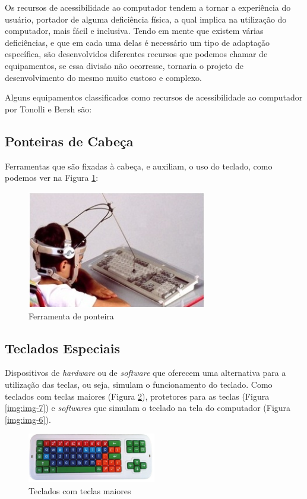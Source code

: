 \documentclass[
	12pt,			%
	openright,		%
	oneside,			%
	a4paper,			%
	chapter=TITLE,		%
	english,			%
	brazil,			%
	]{abntex2}
\begin{document}
Os recursos de acessibilidade ao computador tendem a tornar a experiência do usuário, portador de alguma deficiência física, a qual implica na utilização do computador, mais fácil e inclusiva. Tendo em mente que existem várias deficiências, e que em cada uma delas é necessário um tipo de adaptação específica, são desenvolvidos diferentes recursos que podemos chamar de equipamentos, se essa divisão não ocorresse, tornaria o projeto de desenvolvimento do mesmo muito custoso e complexo.

Alguns equipamentos classificados como recursos de acessibilidade ao computador por Tonolli e Bersh são:

\subsection{Ponteiras de Cabeça}

Ferramentas que são fixadas à cabeça, e auxiliam, o uso do teclado, como podemos ver na Figura \ref{img:img-12}:

\begin{figure}[H]
	\centering
		\includegraphics[width=0.7\textwidth]{./img/img-12.jpg}
		\caption{Ferramenta de ponteira}
		\label{img:img-12}
\end{figure}

\subsection{Teclados Especiais}

Dispositivos de \emph{hardware} ou de \emph{software} que oferecem uma alternativa para a utilização das teclas, ou seja, simulam o funcionamento do teclado. Como teclados com teclas maiores (Figura \ref{img:img-5}), protetores para as teclas (Figura \ref{img:img-7}) e \emph{softwares} que simulam o teclado na tela do computador (Figura \ref{img:img-6}).

\begin{figure}[H]
	\centering
		\includegraphics[width=0.5\textwidth]{./img/img-5.png}
		\caption{Teclados com teclas maiores}
		\label{img:img-5}
\end{figure}
\end{document}
